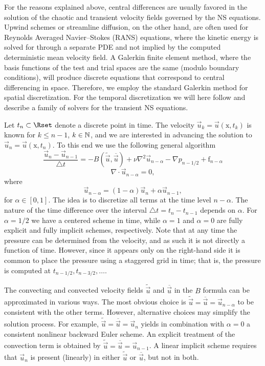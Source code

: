 For the reasons explained above, central differences are usually
favored in the solution of the chaotic and transient velocity fields
governed by the NS equations. Upwind schemes or streamline diffusion,
on the other hand, are often used for Reynolds Averaged Navier--Stokes
(RANS) equations, where the kinetic energy is solved for through a
separate PDE and not implied by the computed deterministic mean
velocity field. A Galerkin finite element method, where the basis
functions of the test and trial spaces are the same (modulo boundary
conditions), will produce discrete equations that correspond to
central differencing in space. Therefore, we employ the standard
Galerkin method for spatial discretization. For the temporal
discretization we will here follow
\citet{SimoArmero1994} and describe a family of solvers for the
transient NS equations.

Let $t_n \subset \Rset$ denote a discrete point in time. The velocity
$\vec{u}_k=\vec{u}(\text{x},t_k)$ is known for $k\leqslant n-1$, $k \in
\mathbb{N}$, and we are interested in advancing the solution to
$\vec{u}_{n}=\vec{u}(\text{x},t_{n})$. To this end we use the
following general algorithm
\begin{equation}
\label{eq:mortensen:NS_d} \frac{\vec{u}_{n}-\vec{u}_{n-1}}{\triangle t} = - B(\tilde{\vec{u}},\overline{\vec{u}}) + \nu \nabla^2 \vec{u}_{n-\alpha} -\nabla p_{n-1/2} + \text{f}_{n-\alpha}
\end{equation}
\begin{equation}
 \label{eq:mortensen:cont_d} \nabla \cdot \vec{u}_{n-\alpha} =0,
\end{equation}
where
\begin{equation}
   \vec{u}_{n-\alpha}=(1-\alpha) \vec{u}_{n} + \alpha \vec{u}_{n-1},
\end{equation}
for $\alpha \in [0,1]$.  The idea is to discretize all terms at the
time level $n-\alpha$. The nature of the time difference over the
interval $\triangle t = t_{n}-t_{n-1}$ depends on $\alpha$. For
$\alpha =1/2$ we have a centered scheme in time, while $\alpha =1$ and
$\alpha=0$ are fully explicit and fully implicit schemes,
respectively. Note that at any time the pressure can be determined
from the velocity, and as such it is not directly a function of
time. However, since it appears only on the right-hand side it is
common to place the pressure using a staggered grid in time; that is,
the pressure is computed at $t_{n-1/2}, t_{n-3/2}, \ldots$.

The convecting and convected velocity fields $\tilde{\vec{u}}$ and
$\overline{\vec{u}}$ in the $B$ formula can be approximated in various
ways. The most obvious choice is
$\tilde{\vec{u}}=\overline{\vec{u}}=\vec{u}_{n-\alpha}$ to be
consistent with the other terms. However, alternative choices may
simplify the solution process. For example,
$\tilde{\vec{u}}=\overline{\vec{u}}=\vec{u}_{n}$ yields in combination
with $\alpha=0$ a consistent nonlinear backward Euler scheme. An
explicit treatment of the convection term is obtained by
$\tilde{\vec{u}} = \overline{\vec{u}} = \vec{u}_{n-1}$.  A linear
implicit scheme requires that $\vec{u}_{n}$ is present (linearly) in
either $\tilde{\vec{u}}$ or $\overline{\vec{u}}$, but not in both.

